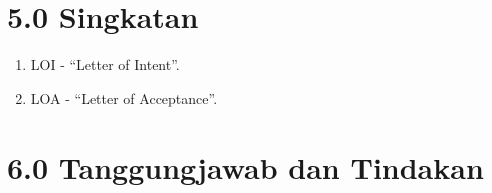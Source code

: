 \documentclass[
]{article}
\begin{document}
\hypertarget{singkatan}{%
\section{5.0 Singkatan}\label{singkatan}}

\begin{enumerate}
\def\labelenumi{\roman{enumi})}
\item
  LOI - ``Letter of Intent''.
\item
  LOA - ``Letter of Acceptance''.
\end{enumerate}

\hypertarget{tanggungjawab-dan-tindakan}{%
\section{6.0 Tanggungjawab dan
Tindakan}\label{tanggungjawab-dan-tindakan}}
\end{document}
